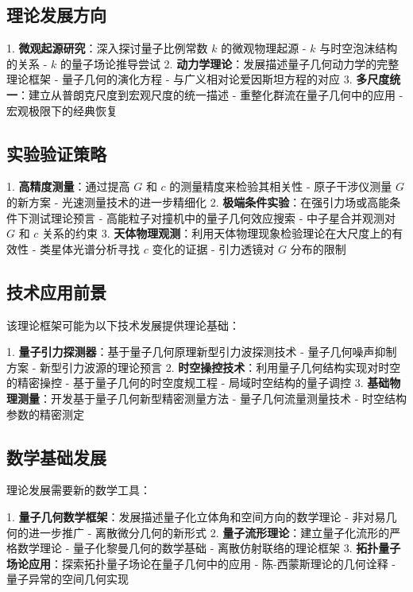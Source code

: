 \documentclass[12pt,twocolumn]{article}
\begin{document}
\subsection{理论发展方向}

1. \textbf{微观起源研究}：深入探讨量子比例常数 $k$ 的微观物理起源
    - $k$ 与时空泡沫结构的关系
    - $k$ 的量子场论推导尝试
2. \textbf{动力学理论}：发展描述量子几何动力学的完整理论框架
    - 量子几何的演化方程
    - 与广义相对论爱因斯坦方程的对应
3. \textbf{多尺度统一}：建立从普朗克尺度到宏观尺度的统一描述
    - 重整化群流在量子几何中的应用
    - 宏观极限下的经典恢复

\subsection{实验验证策略}

1. \textbf{高精度测量}：通过提高 $G$ 和 $c$ 的测量精度来检验其相关性
    - 原子干涉仪测量 $G$ 的新方案\cite{zhan2019}
    - 光速测量技术的进一步精细化
2. \textbf{极端条件实验}：在强引力场或高能条件下测试理论预言
    - 高能粒子对撞机中的量子几何效应搜索
    - 中子星合并观测对 $G$ 和 $c$ 关系的约束
3. \textbf{天体物理观测}：利用天体物理现象检验理论在大尺度上的有效性
    - 类星体光谱分析寻找 $c$ 变化的证据
    - 引力透镜对 $G$ 分布的限制

\subsection{技术应用前景}

该理论框架可能为以下技术发展提供理论基础：

1. \textbf{量子引力探测器}：基于量子几何原理新型引力波探测技术
    - 量子几何噪声抑制方案
    - 新型引力波源的理论预言
2. \textbf{时空操控技术}：利用量子几何结构实现对时空的精密操控
    - 基于量子几何的时空度规工程
    - 局域时空结构的量子调控
3. \textbf{基础物理测量}：开发基于量子几何新型精密测量方法
    - 量子几何流量测量技术
    - 时空结构参数的精密测定

\subsection{数学基础发展}

理论发展需要新的数学工具：

1. \textbf{量子几何数学框架}：发展描述量子化立体角和空间方向的数学理论
    - 非对易几何的进一步推广
    - 离散微分几何的新形式
2. \textbf{量子流形理论}：建立量子化流形的严格数学理论
    - 量子化黎曼几何的数学基础
    - 离散仿射联络的理论框架
3. \textbf{拓扑量子场论应用}：探索拓扑量子场论在量子几何中的应用
    - 陈-西蒙斯理论的几何诠释
    - 量子异常的空间几何实现
\end{document}

